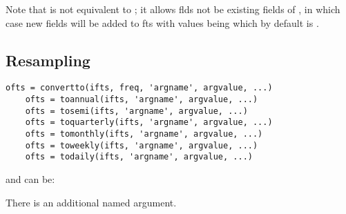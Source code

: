 Note that  is not equivalent to ; 
it allows flds not be existing fields of , in which case new fields will be added to fts 
with values being 
which by default is .

\subsection{Resampling}
\begin{lstlisting}[numbers=none]
   ofts = convertto(ifts, freq, 'argname', argvalue, ...)
	ofts = toannual(ifts, 'argname', argvalue, ...)
	ofts = tosemi(ifts, 'argname', argvalue, ...)
	ofts = toquarterly(ifts, 'argname', argvalue, ...)
	ofts = tomonthly(ifts, 'argname', argvalue, ...)
	ofts = toweekly(ifts, 'argname', argvalue, ...)
	ofts = todaily(ifts, 'argname', argvalue, ...)
\end{lstlisting}

\where
     and  can be:
	
	
	There is an additional named argument.
	
	

